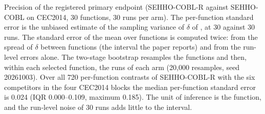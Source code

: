 \begin{table}[htbp]
\centering
\caption{Precision of the primary endpoint at 30 runs per cell.}
\label{tab:supp_precision}
\begin{flushleft}\footnotesize
Precision of the registered primary endpoint (SEHHO-COBL-R against SEHHO-COBL on CEC2014, 30 functions, 30 runs per arm). The per-function standard error is the unbiased estimate of the sampling variance of $\delta$ of \citet{cliff1993dominance}, at 30 against 30 runs. The standard error of the mean over functions is computed twice: from the spread of $\delta$ between functions (the interval the paper reports) and from the run-level errors alone. The two-stage bootstrap resamples the functions and then, within each selected function, the runs of each arm (20{,}000 resamples, seed 20261003). Over all 720 per-function contrasts of SEHHO-COBL-R with the six competitors in the four CEC2014 blocks the median per-function standard error is 0.024 (IQR 0.000--0.109, maximum 0.185). The unit of inference is the function, and the run-level noise of 30 runs adds little to the interval.
\end{flushleft}
\end{table}
